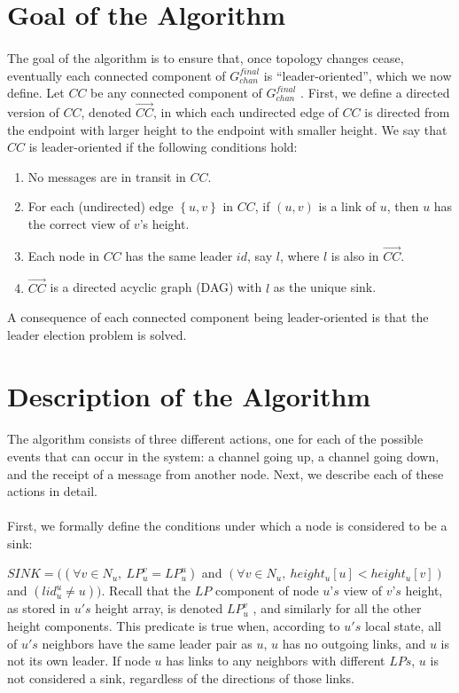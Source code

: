 \section{Goal of the Algorithm}
\paragraph{}The goal of the algorithm is to ensure that, once topology changes cease, eventually each connected component of $G_{chan} ^{final}$ is “leader-oriented”, which we now define. Let $CC$ be any connected component of $G_{chan} ^{final}$ . First, we define a directed version of $CC$, denoted $\overset{\longrightarrow}{CC}$, in which each undirected edge of $CC$ is directed from the endpoint with larger height to the endpoint with smaller height. We say that $CC$ is leader-oriented if the following conditions hold:
\begin{enumerate}
	\item No messages are in transit in $CC$.
	\item For each (undirected) edge $\left\lbrace  u, v \right\rbrace $ in $CC$, if $(u, v)$ is a link of $u$, then $u$ has the correct view of $v$’s height.
	\item  Each node in $CC$ has the same leader $id$, say $l$, where $l$ is also in $\overset{\longrightarrow}{CC}$. 
	\item  $\overset{\longrightarrow}{CC}$ is a directed acyclic graph (DAG) with $l$ as the unique sink.
\end{enumerate}
A consequence of each connected component being leader-oriented is that the leader election problem is solved.
\section{Description of the Algorithm}
\paragraph{}The algorithm consists of three different actions, one for each of the possible events that can occur in the system: a channel going up, a channel going down, and the receipt of a message from another node. Next, we describe each of these actions in detail.
\paragraph{}First, we formally define the conditions under which a node is considered to be a sink:
\begin{list}{--}{}
	\item $SINK = ((\forall v \in N_u,~LP_u ^v = LP_u ^u )$ and $(\forall v \in N_u,~height_u[u] < height_u[v])$ and $(lid_u ^u \neq u))$. Recall that the $LP$ component of node $u’s$ view of $v’s$ height, as stored in $u's$ height array, is denoted $LP_u ^v$ , and similarly for all the other height components. This predicate is true when, according to $u's$ local state, all of $u's$ neighbors have the same leader pair as $u$, $u$ has no outgoing links, and $u$ is not its own leader. If node $u$ has links to any neighbors with different $LPs$, $u$ is not considered a sink, regardless of the directions of those links.
\end{list}
